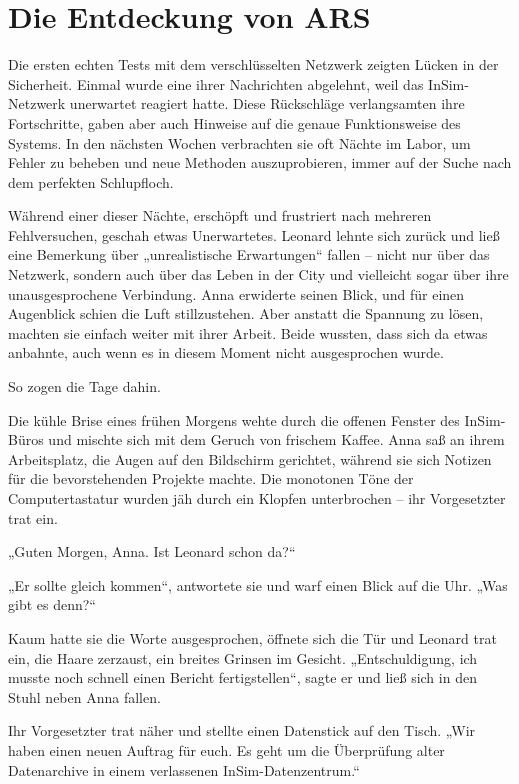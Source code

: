\documentclass[
]{article}
\begin{document}
\section{Die Entdeckung von ARS}\label{die-entdeckung-von-ars}

Die ersten echten Tests mit dem verschlüsselten Netzwerk zeigten Lücken in der Sicherheit. Einmal wurde eine ihrer Nachrichten abgelehnt, weil das InSim-Netzwerk unerwartet reagiert hatte. Diese Rückschläge verlangsamten ihre Fortschritte, gaben aber auch Hinweise auf die genaue Funktionsweise des Systems. In den nächsten Wochen verbrachten sie oft Nächte im Labor, um Fehler zu beheben und neue Methoden auszuprobieren, immer auf der Suche nach dem perfekten Schlupfloch.

Während einer dieser Nächte, erschöpft und frustriert nach mehreren Fehlversuchen, geschah etwas Unerwartetes. Leonard lehnte sich zurück und ließ eine Bemerkung über „unrealistische Erwartungen`` fallen -- nicht nur über das Netzwerk, sondern auch über das Leben in der City und vielleicht sogar über ihre unausgesprochene Verbindung. Anna erwiderte seinen Blick, und für einen Augenblick schien die Luft stillzustehen. Aber anstatt die Spannung zu lösen, machten sie einfach weiter mit ihrer Arbeit. Beide wussten, dass sich da etwas anbahnte, auch wenn es in diesem Moment nicht ausgesprochen wurde.

So zogen die Tage dahin.

Die kühle Brise eines frühen Morgens wehte durch die offenen Fenster des InSim-Büros und mischte sich mit dem Geruch von frischem Kaffee. Anna saß an ihrem Arbeitsplatz, die Augen auf den Bildschirm gerichtet, während sie sich Notizen für die bevorstehenden Projekte machte. Die monotonen Töne der Computertastatur wurden jäh durch ein Klopfen unterbrochen -- ihr Vorgesetzter trat ein.

„Guten Morgen, Anna. Ist Leonard schon da?{\kern0pt}``

„Er sollte gleich kommen``, antwortete sie und warf einen Blick auf die Uhr. „Was gibt es denn?{\kern0pt}``

Kaum hatte sie die Worte ausgesprochen, öffnete sich die Tür und Leonard trat ein, die Haare zerzaust, ein breites Grinsen im Gesicht. „Entschuldigung, ich musste noch schnell einen Bericht fertigstellen``, sagte er und ließ sich in den Stuhl neben Anna fallen.

Ihr Vorgesetzter trat näher und stellte einen Datenstick auf den Tisch. „Wir haben einen neuen Auftrag für euch. Es geht um die Überprüfung alter Datenarchive in einem verlassenen InSim-Datenzentrum.``
\end{document}
